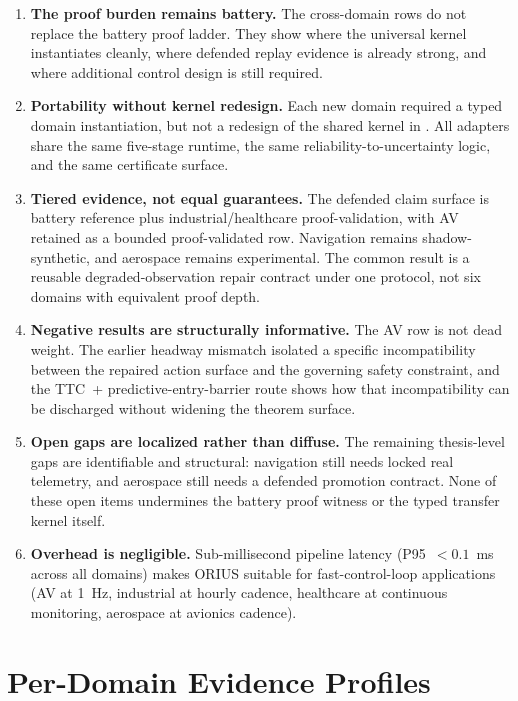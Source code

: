 \begin{enumerate}
  \item \textbf{The proof burden remains battery.} The cross-domain rows do not
    replace the battery proof ladder.  They show where the universal kernel
    instantiates cleanly, where defended replay evidence is already strong,
    and where additional control design is still required.
  \item \textbf{Portability without kernel redesign.} Each new domain required
    a typed domain instantiation, but not a redesign of the shared kernel in
    .  All adapters share the same
    five-stage runtime, the same reliability-to-uncertainty logic, and the
    same certificate surface.
  \item \textbf{Tiered evidence, not equal guarantees.} The defended claim
    surface is battery reference plus industrial/healthcare
    proof-validation, with AV retained as a bounded proof-validated row. Navigation remains shadow-synthetic, and
    aerospace remains experimental.  The common result is a reusable
    degraded-observation repair contract under one protocol, not six domains
    with equivalent proof depth.
  \item \textbf{Negative results are structurally informative.} The AV row is
    not dead weight.  The earlier headway mismatch isolated a specific
    incompatibility between the repaired action surface and the governing
    safety constraint, and the TTC~+ predictive-entry-barrier route shows how
    that incompatibility can be discharged without widening the theorem
    surface.
  \item \textbf{Open gaps are localized rather than diffuse.} The remaining
    thesis-level gaps are identifiable and structural: navigation still needs
    locked real telemetry, and aerospace still needs a defended promotion
    contract.  None of these open items undermines the battery proof witness
    or the typed transfer kernel itself.
  \item \textbf{Overhead is negligible.} Sub-millisecond pipeline latency
    (P95~$<\!0.1$~ms across all domains) makes ORIUS suitable for
    fast-control-loop applications (AV at 1~Hz, industrial at hourly cadence,
    healthcare at continuous monitoring, aerospace at avionics cadence).
\end{enumerate}

\section{Per-Domain Evidence Profiles}
\label{sec:per-domain-profiles}

